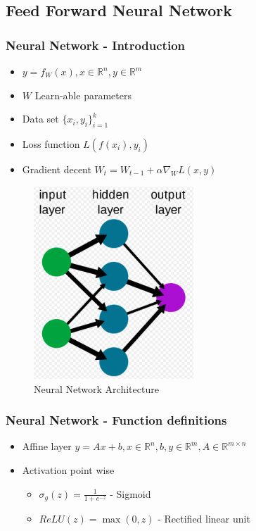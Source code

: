 \documentclass[12pt]{report}
\begin{document}
\subsection{Feed Forward Neural Network}

\subsubsection{Neural Network - Introduction}
\begin{itemize}
	\item $y = f_{W}(x), x \in \mathbb{R}^n, y \in \mathbb{R}^m$ 
	\item $W$ Learn-able parameters
	\item Data set $\{x_i, y_i \}_{i=1}^k$
	\item Loss function $L(f(x_i), y_i)$
	\item Gradient decent $W_t = W_{t-1} + \alpha \nabla_{W}L(x,y) $ 
\end{itemize}

\begin{figure}[H]\centering\includegraphics[width=6cm]{FFNN.png}\caption{Neural Network Architecture}\end{figure}

\newpage
\subsubsection{Neural Network - Function definitions}
\begin{itemize}
	\item Affine layer $y = Ax + b , x \in \mathbb{R}^n, b, y \in \mathbb{R}^m, A \in \mathbb{R}^{m \times n}$
	\item Activation point wise
	\begin{itemize}
		\item $\sigma_g(z) = \frac{1}{1+e^{-z}}$ - Sigmoid 
		\item $ReLU(z) = \max(0, z)$  - Rectified linear unit
	\end{itemize}	
\end{itemize}
\end{document}

